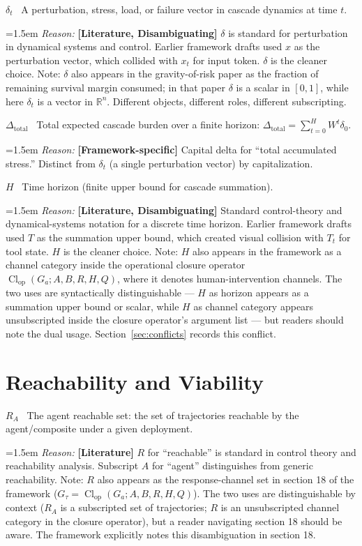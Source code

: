 \documentclass[11pt]{article}
\DeclareMathOperator{\Cl}{Cl}
\newcommand{\notation}[2]{%
  \par\smallskip
  \noindent\textbf{#1} \, #2\par
}
\newcommand{\reason}[2]{%
  \par\nopagebreak
  \begingroup
    \leftskip=1.5em
    \sloppy
    \noindent\textit{Reason:} \textbf{[#1]} #2\par
  \endgroup
  \par\smallskip
}
\begin{document}
\notation{$\delta_t$}{A perturbation, stress, load, or failure vector in cascade dynamics at time $t$.}
\reason{Literature, Disambiguating}{$\delta$ is standard for perturbation in dynamical systems and control. Earlier framework drafts used $x$ as the perturbation vector, which collided with $x_t$ for input token. $\delta$ is the cleaner choice. Note: $\delta$ also appears in the gravity-of-risk paper as the fraction of remaining survival margin consumed; in that paper $\delta$ is a scalar in $[0, 1]$, while here $\delta_t$ is a vector in $\mathbb{R}^n$. Different objects, different roles, different subscripting.}

\notation{$\Delta_{\text{total}}$}{Total expected cascade burden over a finite horizon: $\Delta_{\text{total}} = \sum_{t=0}^{H} W^t \delta_0$.}
\reason{Framework-specific}{Capital delta for ``total accumulated stress.'' Distinct from $\delta_t$ (a single perturbation vector) by capitalization.}

\notation{$H$}{Time horizon (finite upper bound for cascade summation).}
\reason{Literature, Disambiguating}{Standard control-theory and dynamical-systems notation for a discrete time horizon. Earlier framework drafts used $T$ as the summation upper bound, which created visual collision with $T_t$ for tool state. $H$ is the cleaner choice. Note: $H$ also appears in the framework as a channel category inside the operational closure operator $\Cl_{\text{op}}(G_a; A, B, R, H, Q)$, where it denotes human-intervention channels. The two uses are syntactically distinguishable --- $H$ as horizon appears as a summation upper bound or scalar, while $H$ as channel category appears unsubscripted inside the closure operator's argument list --- but readers should note the dual usage. Section~\ref{sec:conflicts} records this conflict.}

\section{Reachability and Viability}

\notation{$R_A$}{The agent reachable set: the set of trajectories reachable by the agent/composite under a given deployment.}
\reason{Literature}{$R$ for ``reachable'' is standard in control theory and reachability analysis. Subscript $A$ for ``agent'' distinguishes from generic reachability. Note: $R$ also appears as the response-channel set in section 18 of the framework ($G_\tau = \Cl_{\text{op}}(G_a; A, B, R, H, Q)$). The two uses are distinguishable by context ($R_A$ is a subscripted set of trajectories; $R$ is an unsubscripted channel category in the closure operator), but a reader navigating section 18 should be aware. The framework explicitly notes this disambiguation in section 18.}
\end{document}
